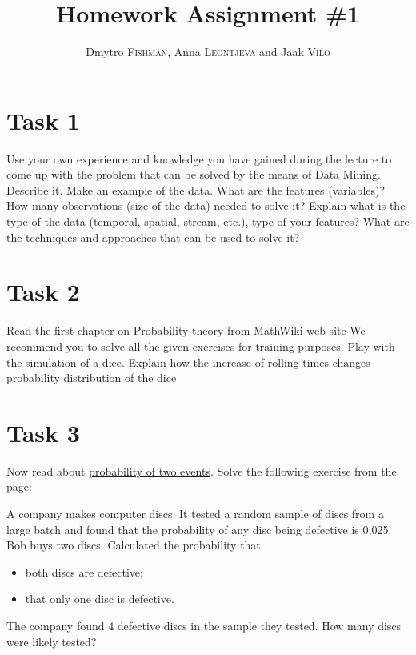 \documentclass{article}
\title{Homework Assignment \#1} %
\author{Dmytro \textsc{Fishman}, Anna \textsc{Leontjeva} and Jaak \textsc{Vilo}} %
\begin{document}
\maketitle %
\section*{Task 1}
Use your own experience and knowledge you have gained during the lecture to come up with the problem that can be solved by the means of Data Mining. Describe it. Make an example of the data. What are the features (variables)? How many observations (size of the data) needed to solve it? Explain what is the type of the data (temporal, spatial, stream, etc.), type of your features? What are the techniques and approaches that can be used to solve it?  

\section*{Task 2}
Read the first chapter on \href{http://mathwiki.cs.ut.ee/probability_theory}{Probability theory} from \href{http://mathwiki.cs.ut.ee/start}{MathWiki} web-site  We recommend you to solve all the given exercises for training purposes. Play with the simulation of a dice. Explain how the increase of rolling times changes probability distribution of the dice

\section*{Task 3}
Now read about \href{http://mathwiki.cs.ut.ee/probability/02_multiple_event_probability}{probability of two events}. Solve the following exercise from the page:
\begin{framed}
A company makes computer discs. It tested a random sample of discs from a large batch and found that the probability of any disc being defective is 0,025.
\\
Bob buys two discs. Calculated the probability that
\begin{itemize}
\item both discs are defective;
\item that only one disc is defective.
\end{itemize}

The company found 4 defective discs in the sample they tested. How many discs were likely tested?
\end{framed}
\end{document}
